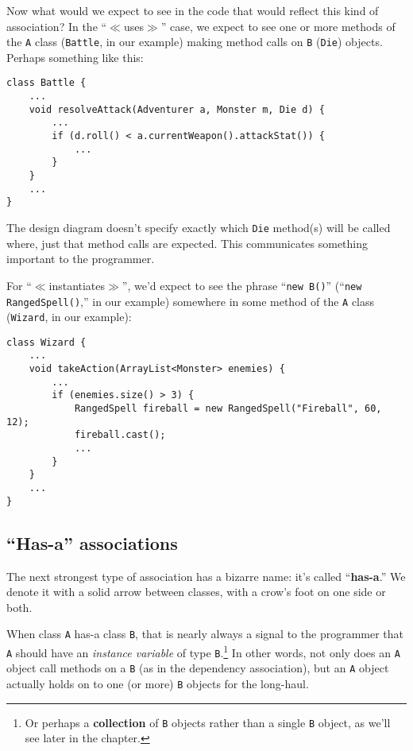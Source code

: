
Now what would we expect to see in the code that would reflect this kind of
association? In the ``$\ll$uses$\gg$'' case, we expect to see one or more
methods of the \texttt{A} class (\texttt{Battle}, in our example) making method
calls on \texttt{B} (\texttt{Die}) objects. Perhaps something like this:

\begin{Verbatim}[fontsize=\scriptsize,samepage=true,frame=single]
class Battle {
    ...
    void resolveAttack(Adventurer a, Monster m, Die d) {
        ...
        if (d.roll() < a.currentWeapon().attackStat()) {
            ...
        }
    }
    ...
}
\end{Verbatim}

The design diagram doesn't specify exactly which \texttt{Die} method(s) will be
called where, just that method calls are expected. This communicates something
important to the programmer.


For ``$\ll$instantiates$\gg$'', we'd expect to see the phrase ``\texttt{new
B()}'' (``\texttt{new RangedSpell()},'' in our example) somewhere in some
method of the \texttt{A} class (\texttt{Wizard}, in our example):

\begin{Verbatim}[fontsize=\scriptsize,samepage=true,frame=single]
class Wizard {
    ...
    void takeAction(ArrayList<Monster> enemies) {
        ...
        if (enemies.size() > 3) {
            RangedSpell fireball = new RangedSpell("Fireball", 60, 12);
            fireball.cast();
            ...
        }
    }
    ...
}
\end{Verbatim}

\subsection{``Has-a'' associations}


The next strongest type of association has a bizarre name: it's called
``\textbf{has-a}.'' We denote it with a solid arrow between classes, with a
crow's foot on one side or both.

When class \texttt{A} has-a class \texttt{B}, that is nearly always a signal
to the programmer that \texttt{A} should have an \textit{instance variable} of
type \texttt{B}.\footnote{Or perhaps a \textbf{collection} of \texttt{B}
objects rather than a single \texttt{B} object, as we'll see later in the
chapter.} In other words, not only does an \texttt{A} object call
methods on a \texttt{B} (as in the dependency association), but an \texttt{A}
object actually holds on to one (or more) \texttt{B} objects for the
long-haul.

